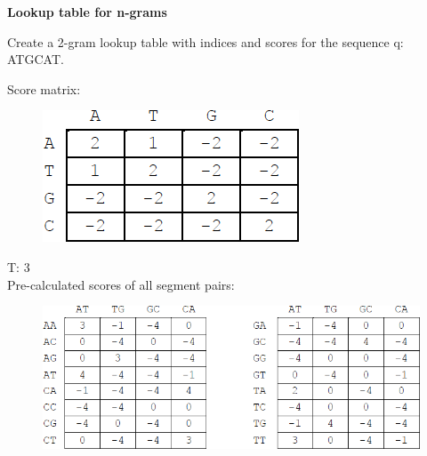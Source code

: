 \question \textbf{Lookup table for n-grams}
  
Create a 2-gram lookup table with indices and scores for the sequence q: ATGCAT. 

\medskip 

Score matrix:
\begin{figure}[H]
      \centering
      \includegraphics[width=0.25 \textwidth]{fig05/score_scheme_2.png}
\end{figure}

 T: 3 \\

Pre-calculated scores of all segment pairs:
\begin{figure}[H]
      \centering
      \includegraphics[width=0.65 \textwidth]{fig05/lookup_table_precalculated.png}
\end{figure}

